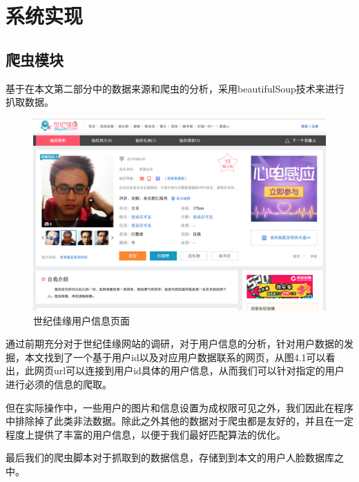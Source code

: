 
\chapter{系统实现}
\section{爬虫模块}
基于在本文第二部分中的数据来源和爬虫的分析，采用beautifulSoup技术来进行扒取数据。
\begin{figure}[h]
\includegraphics[width=\textwidth]{img/chap4/jiayuan1.png}
\caption{世纪佳缘用户信息页面\label{Face++API}}
\end{figure}

通过前期充分对于世纪佳缘网站的调研，对于用户信息的分析，针对用户数据的发掘，本文找到了一个基于用户id以及对应用户数据联系的网页，从图4.1可以看出，此网页url可以连接到用户id具体的用户信息，从而我们可以针对指定的用户进行必须的信息的爬取。

但在实际操作中，一些用户的图片和信息设置为成权限可见之外，我们因此在程序中排除掉了此类非法数据。除此之外其他的数据对于爬虫都是友好的，并且在一定程度上提供了丰富的用户信息，以便于我们最好匹配算法的优化。

最后我们的爬虫脚本对于抓取到的数据信息，存储到到本文的用户人脸数据库之中。

